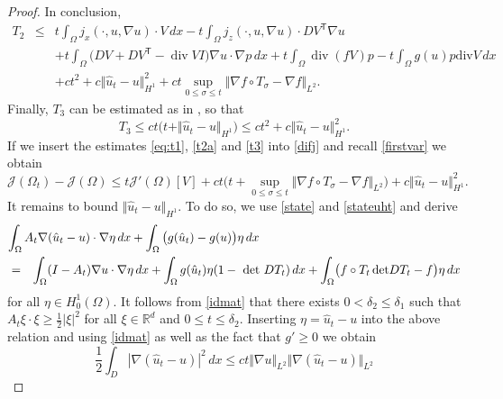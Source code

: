 \documentclass[a4paper,10pt]{article}
\newcommand{\dx}{\,dx}
\theoremstyle{plain}
\theoremstyle{plain}
\numberwithin{equation}{section}
\DeclareMathOperator{\Div}{div}
\begin{document}
\begin{proof}
In conclusion,
\begin{eqnarray}
T_2 & \leq &  t  \int_{\Omega} j_x(\cdot,u,\nabla u) \cdot V  \dx - t \int_{\Omega} j_z(\cdot,u,\nabla u) \cdot DV^{\mathsf{T}} \nabla u \nonumber \\
& & +  t \int_{\Omega} \bigl( D V + D V^{\mathsf{T}} - \Div V I  \bigr) \nabla u \cdot \nabla p  \dx + 
t \int_{\Omega} \Div( f V) p -t\int_{\Omega} g(u)p \mbox{div}V  \dx  \nonumber \\
& & +  c t^2 +c \Vert \hat u_t - u \Vert_{H^1}^2 + c t  \sup_{0 \leq \sigma \leq t} \Vert \nabla f \circ T_\sigma - \nabla f \Vert_{L^2}. \label{t2a}
\end{eqnarray}
Finally, $T_3$ can be estimated as in \cite[(3.19)]{DHH25-convergence},
so that 
\begin{equation} \label{t3}
T_3 \leq ct \bigl( t + \Vert \hat u_t - u \Vert_{H^1} \bigr) \leq c t^2 + c \Vert \hat u_t - u \Vert_{H^1}^2.
\end{equation}
If we insert the estimates \eqref{eq:t1}, \eqref{t2a} and \eqref{t3} into \eqref{difj} and recall \eqref{firstvar} we obtain
\begin{equation} \label{difj1}
\mathcal J(\Omega_t) - \mathcal J(\Omega)  \leq    t \mathcal J'(\Omega)[V]  + ct \bigl( t  +  \sup_{0 \leq \sigma \leq t} \Vert \nabla f \circ T_\sigma - \nabla f \Vert_{L^2} \bigr)
+ c \Vert \hat u_t - u \Vert^2_{H^1}.
\end{equation}
It remains to bound $\Vert \hat u_t - u \Vert_{H^1}$. To do so,  we use \eqref{state} and \eqref{stateuht} and derive
\begin{eqnarray*}
\lefteqn{\int_{\Omega} A_t  \nabla ( \hat u_t - u) \cdot \nabla \eta  \dx + \int_{\Omega}\big(g(\hat u_t)-g(u)\big)\eta \dx}\\ &=& \int_{\Omega} (I-A_t) \nabla u \cdot \nabla \eta  \dx + \int_{\Omega}g(\hat u_t)\eta (1-\mbox{ det }DT_t) \dx + \int_{\Omega} \bigl(
f \circ T_t  \, \mbox{det} D T_t -f \bigr) \eta  \dx
\end{eqnarray*}
for all $\eta \in H^1_0(\Omega)$.
It follows from  \eqref{idmat} that there exists $0< \delta_2 \leq \delta_1$ such that $A_t \xi \cdot \xi \geq \frac{1}{2} | \xi |^2$ for all $\xi \in \mathbb R^d$ and $0 \leq t \leq \delta_2$. Inserting $\eta=
\hat u_t-u$ into the above relation and using \eqref{idmat} as well as the
fact that $g' \geq 0$  we obtain
\begin{equation} \label{eq:hatu}
\frac{1}{2} \int_D |  \nabla (\hat u_t - u) |^2  \dx   \leq  c t \Vert \nabla u \Vert_{L^2} \Vert \nabla (\hat u_t - u) \Vert_{L^2}

\end{equation}
\end{proof}
\end{document}

